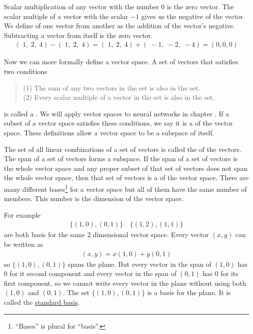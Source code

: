    Scalar multiplication of any vector with the number $0$ is the zero vector.
The scalar multiple of a vector with the scalar $-1$ gives us the negative
of the vector. We define  of one vector from 
another as the addition of the vector's negative. Subtracting a vector from 
itself is the zero vector.
\begin{eqnarray*}
  (\; 1, \; 2, \; 4) - (\; 1, \; 2, \; 4) = 
  (\; 1, \; 2, \; 4) + (\; -1, \; -2, \; -4) = (0,0,0)
\end{eqnarray*}

 Now we can more formally define a vector space. A set of vectors that satisfies two conditions
\begin{quote}
(1) The sum of any two vectors in the set is also in the set.\\
(2) Every scalar multiple of a vector in the set is also in the set. 
\end{quote}
is called a . We will apply vector spaces to neural 
networks in chapter . If a subset of a vector space satisfies these 
conditions, we say it is a  of the vector space. These 
definitions allow a vector space to be a subspace of itself. 

   The set of all linear combinations of a set of vectors is called the 
 of the vectors. The span of a set of vectors forms a 
subspace. If the span of a set of vectors is the whole vector space and any
proper subset of that set of vectors does not span the whole vector space, then 
that set of vectors is a  of the vector space. There are
many different bases\footnote{``Bases'' is plural for ``basis''.} for a vector space but 
all of them have the same number of members. This number is the dimension of 
the vector space. 

   For example
\begin{eqnarray*}
\{ (1,0), (0,1) \} \quad \{ (1,2), (1,1) \}
\end{eqnarray*}
are both basis for the same 2 dimensional vector space. Every vector $(x,y)$
can be written as
\begin{eqnarray*}
(x,y) = x(1,0)+y(0,1)
\end{eqnarray*}  
so $\{ (1,0), (0,1) \}$ spans the plane. But every vector in the span of
$(1,0)$ has $0$ for it second component and every vector in the span of $(0,1)$
has $0$ for its first component, so we cannot write every vector in the plane 
without using both $(1,0)$ and $(0,1)$. The set $\{ (1,0), (0,1) \}$ is a basis for the plane. It is called the \underline{standard basis}. 

